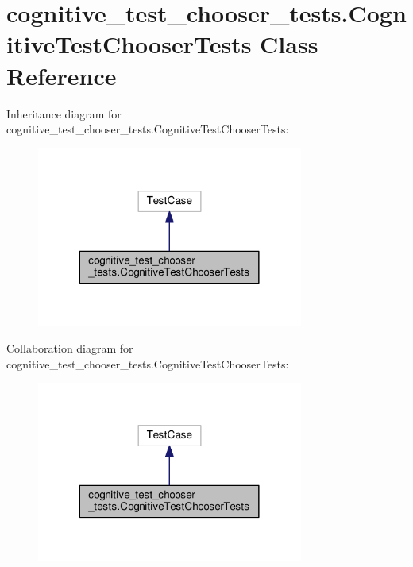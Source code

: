 \hypertarget{classcognitive__test__chooser__tests_1_1CognitiveTestChooserTests}{\section{cognitive\-\_\-test\-\_\-chooser\-\_\-tests.\-Cognitive\-Test\-Chooser\-Tests Class Reference}
\label{classcognitive__test__chooser__tests_1_1CognitiveTestChooserTests}
}


Inheritance diagram for cognitive\-\_\-test\-\_\-chooser\-\_\-tests.\-Cognitive\-Test\-Chooser\-Tests\-:
\nopagebreak
\begin{figure}[H]
\begin{center}
\leavevmode
\includegraphics[width=248pt]{classcognitive__test__chooser__tests_1_1CognitiveTestChooserTests__inherit__graph}
\end{center}
\end{figure}


Collaboration diagram for cognitive\-\_\-test\-\_\-chooser\-\_\-tests.\-Cognitive\-Test\-Chooser\-Tests\-:
\nopagebreak
\begin{figure}[H]
\begin{center}
\leavevmode
\includegraphics[width=248pt]{classcognitive__test__chooser__tests_1_1CognitiveTestChooserTests__coll__graph}
\end{center}
\end{figure}
